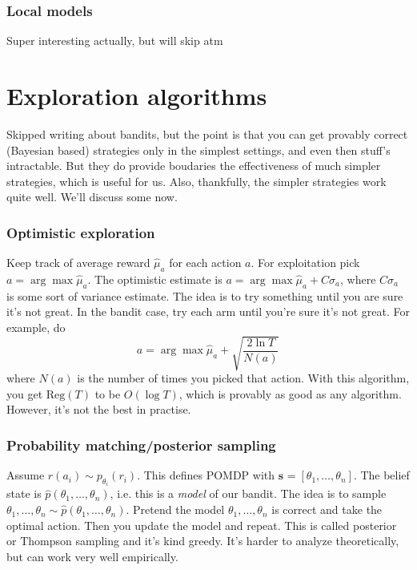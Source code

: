 \documentclass{report}
\newcommand{\argmax}{\arg\!\max}
\begin{document}
\subsubsection{Local models}
Super interesting actually, but will skip atm

\section{Exploration algorithms}
Skipped writing about bandits, but the point is that you can get provably correct (Bayesian based) strategies only in the simplest settings,
and even then stuff's intractable. But they do provide boudaries the effectiveness of much simpler strategies, which is useful for us.
Also, thankfully, the simpler strategies work quite well. We'll discuss some now.

\subsubsection{Optimistic exploration}
Keep track of average reward $\hat{\mu}_a$ for each action $a$.
For exploitation pick $a = \argmax \hat{\mu}_a$.
The optimistic estimate is $a = \argmax \hat{\mu}_a + C \sigma_a$,
where $C \sigma_a$ is some sort of variance estimate.
The idea is to try something until you are sure it's not great.
In the bandit case, try each arm until you're sure it's not great.
For example, do 
\begin{equation}
		a = \argmax \hat{\mu}_a + \sqrt{ \frac{2 \ln T}{N(a)} }
\end{equation}
where $N(a)$ is the number of times you picked that action.
With this algorithm, you get $\text{Reg}(T)$ to be $O(\log T)$, which is provably as good as any algorithm.
However, it's not the best in practise.

\subsubsection{Probability matching/posterior sampling}
Assume $ r(a_i) \sim p_{\theta_i} (r_i)  $. This defines POMDP with $ \bm{s}_{} = \left[ \theta_1, \dots, \theta_n \right]   $.
The belief state is $\hat{p}(\theta_1, \dots, \theta_n)$, i.e. this is a \textit{model} of our bandit.
The idea is to sample $ \theta_1, \dots, \theta_n  \sim \hat{p}(\theta_1, \dots, \theta_n)$. Pretend
the model $   \theta_1, \dots, \theta_n$ is correct and take the optimal action.
Then you update the model and repeat.
This is called posterior or Thompson sampling and it's kind greedy.
It's harder to analyze theoretically, but can work very well empirically.
\end{document}
